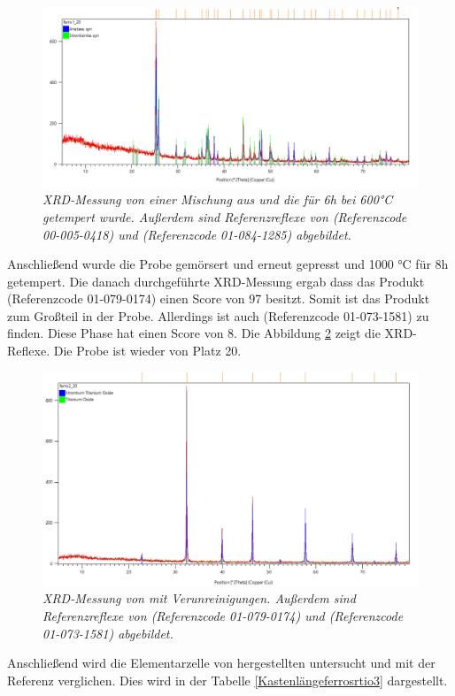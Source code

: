 \documentclass[12pt, a4paper]{article}
\begin{document}
\begin{figure}[h!]
  \begin{center}
   
  \includegraphics[scale=0.5]{Ferro1SrTiO3.png}
\caption{\textit{XRD-Messung von einer Mischung aus  und  die für 6h bei 600°C getempert wurde. Außerdem sind Referenzreflexe von 
 (Referenzcode 00-005-0418) und  (Referenzcode 01-084-1285) abgebildet.}}

\label{Ferro1SrTiO3}

 \end{center}

\end{figure}
\noindent
Anschließend wurde die Probe gemörsert und erneut gepresst und 1000 °C für 8h getempert. Die danach durchgeführte
XRD-Messung ergab dass das Produkt  (Referenzcode 01-079-0174) einen Score von 97 besitzt. Somit ist das Produkt zum Großteil in der Probe. 
Allerdings ist auch  (Referenzcode 01-073-1581) zu finden. Diese Phase hat einen Score von 8. Die Abbildung \ref{Ferro2SrTiO3} zeigt die XRD-Reflexe. Die Probe ist wieder von Platz 20.
\newpage

\begin{figure}[!h]
  \begin{center}
   
  \includegraphics[scale=0.5]{Ferro2SrTiO3.png}
\caption{\textit{XRD-Messung von  mit  Verunreinigungen. Außerdem sind Referenzreflexe von 
 (Referenzcode 01-079-0174) und  (Referenzcode 01-073-1581) abgebildet.}}
\label{Ferro2SrTiO3}
 \end{center}
\end{figure}
\noindent
Anschließend wird die Elementarzelle von hergestellten  untersucht und mit der Referenz verglichen. Dies wird in der Tabelle \ref{Kastenlängeferrosrtio3} dargestellt.
\end{document}
